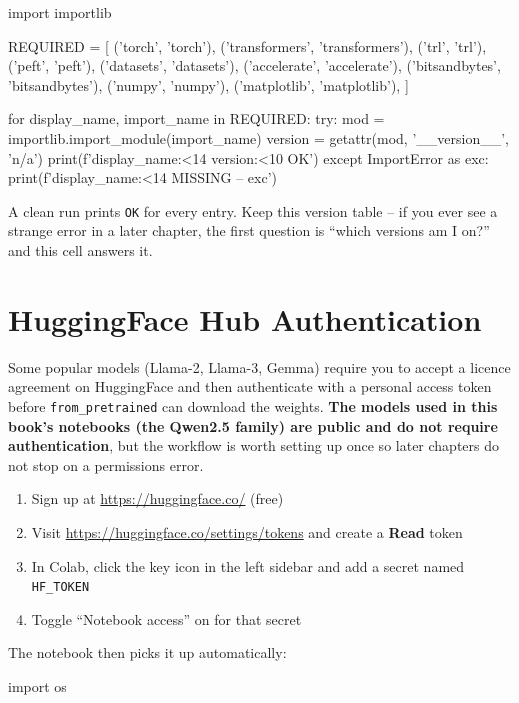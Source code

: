 \begin{chapterenv}
\begin{codeblock}[python]
import importlib

REQUIRED = [
    ('torch',          'torch'),
    ('transformers',   'transformers'),
    ('trl',            'trl'),
    ('peft',           'peft'),
    ('datasets',       'datasets'),
    ('accelerate',     'accelerate'),
    ('bitsandbytes',   'bitsandbytes'),
    ('numpy',          'numpy'),
    ('matplotlib',     'matplotlib'),
]

for display_name, import_name in REQUIRED:
    try:
        mod = importlib.import_module(import_name)
        version = getattr(mod, '__version__', 'n/a')
        print(f'{display_name:<14} {version:<10} OK')
    except ImportError as exc:
        print(f'{display_name:<14} MISSING -- {exc}')
\end{codeblock}

A clean run prints \texttt{OK} for every entry. Keep this version table -- if you ever see a strange error in a later chapter, the first question is ``which versions am I on?'' and this cell answers it.

\section{HuggingFace Hub Authentication}

Some popular models (Llama-2, Llama-3, Gemma) require you to accept a licence agreement on HuggingFace and then authenticate with a personal access token before \texttt{from\_pretrained} can download the weights. \textbf{The models used in this book's notebooks (the Qwen2.5 family) are public and do not require authentication}, but the workflow is worth setting up once so later chapters do not stop on a permissions error.

\begin{enumerate}[nosep]
    \item Sign up at \url{https://huggingface.co/} (free)
    \item Visit \url{https://huggingface.co/settings/tokens} and create a \textbf{Read} token
    \item In Colab, click the key icon in the left sidebar and add a secret named \texttt{HF\_TOKEN}
    \item Toggle ``Notebook access'' on for that secret
\end{enumerate}

The notebook then picks it up automatically:

\begin{codeblock}[python]
import os


\end{codeblock}
\end{chapterenv}
